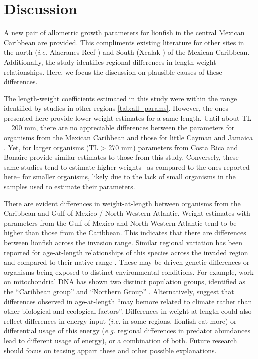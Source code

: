 \documentclass[fleqn,10pt,lineno]{wlpeerj} %
\theoremstyle{definition}
\theoremstyle{definition}
\theoremstyle{definition}
\theoremstyle{remark}
\begin{document}
\section*{Discussion}

A new pair of allometric growth parameters for lionfish in the central
Mexican Caribbean are provided. This compliments existing literature for
other sites in the north (\emph{i.e.} Alacranes Reef
\citep{aguilarperera_2016}) and South (Xcalak \citep{sabidoitza_2016})
of the Mexican Caribbean. Additionally, the study identifies regional
differences in length-weight relationships. Here, we focus the
discussion on plausible causes of these differences.

The length-weight coefficients estimated in this study were within the
range identified by studies in other regions \ref{tab:all_params}.
However, the ones presented here provide lower weight estimates for a
same length. Until about TL = 200 mm, there are no appreciable
differences between the parameters for organisms from the Mexican
Caribbean and those for little Cayman \citep{edwards_2014} and Jamaica
\citep{chin_2016}. Yet, for larger organisms (TL \textgreater{} 270 mm)
parameters from Costa Rica \citep{sandel_2015} and Bonaire
\citep{deleon_2013} provide similar estimates to those from this study.
Conversely, these same studies tend to estimate higher weights --as
compared to the ones reported here-- for smaller organisms, likely due
to the lack of small organisms in the samples used to estimate their
parameters.

There are evident differences in weight-at-length between organisms from
the Caribbean and Gulf of Mexico / North-Western Atlantic. Weight
estimates with parameters from the Gulf of Mexico and North-Western
Atlantic tend to be higher than those from the Caribbean. This indicates
that there are differences between lionfish across the invasion range.
Similar regional variation has been reported for age-at-length
relationships of this species across the invaded region
\citep{fogg_2015} and compared to their native range
\citep{pusack_2016}. These may be driven genetic differences or
organisms being exposed to distinct environmental conditions. For
example, work on mitochondrial DNA has shown two distinct population
groups, identified as the ``Caribbean group'' and ``Northern Group''
\citep{betancurr_201}. Alternatively, \citet{fogg_2015} suggest that
differences observed in age-at-length ``may bemore related to climate
rather than other biological and ecological factors''. Differences in
weight-at-length could also reflect differences in energy input
(\emph{i.e.} in some regions, lionfish eat more) or differential usage
of this energy (\emph{e.g.} regional differences in predator abundances
lead to different usage of energy), or a combination of both. Future
research should focus on teasing appart these and other possible
explanations.
\end{document}
